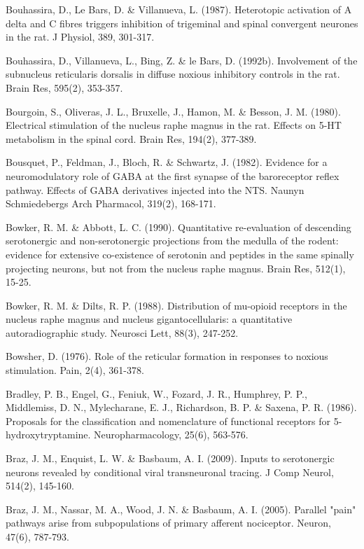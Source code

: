 \documentclass[a4paper,12pt,twoside]{report}
\begin{document}
\begin{singlespacing}
\begin{footnotesize}
Bouhassira, D., Le Bars, D. \& Villanueva, L. (1987). Heterotopic activation of A delta and C fibres triggers inhibition of trigeminal and spinal convergent neurones in the rat. J Physiol, 389, 301-317.

Bouhassira, D., Villanueva, L., Bing, Z. \& le Bars, D. (1992b). Involvement of the subnucleus reticularis dorsalis in diffuse noxious inhibitory controls in the rat. Brain Res, 595(2), 353-357.

Bourgoin, S., Oliveras, J. L., Bruxelle, J., Hamon, M. \& Besson, J. M. (1980). Electrical stimulation of the nucleus raphe magnus in the rat. Effects on 5-HT metabolism in the spinal cord. Brain Res, 194(2), 377-389.

Bousquet, P., Feldman, J., Bloch, R. \& Schwartz, J. (1982). Evidence for a neuromodulatory role of GABA at the first synapse of the baroreceptor reflex pathway. Effects of GABA derivatives injected into the NTS. Naunyn Schmiedebergs Arch Pharmacol, 319(2), 168-171.

Bowker, R. M. \& Abbott, L. C. (1990). Quantitative re-evaluation of descending serotonergic and non-\linebreak serotonergic projections from the medulla of the rodent: evidence for extensive co-existence of serotonin and peptides in the same spinally projecting neurons, but not from the nucleus raphe magnus. Brain Res, 512(1), 15-25.

Bowker, R. M. \& Dilts, R. P. (1988). Distribution of mu-opioid receptors in the nucleus raphe magnus and nucleus gigantocellularis: a quantitative autoradiographic study. Neurosci Lett, 88(3), 247-252.

Bowsher, D. (1976). Role of the reticular formation in responses to noxious stimulation. Pain, 2(4), 361-378.

Bradley, P. B., Engel, G., Feniuk, W., Fozard, J. R., Humphrey, P. P., Middlemiss, D. N., Mylecharane, E. J., Richardson, B. P. \& Saxena, P. R. (1986). Proposals for the classification and nomenclature of functional receptors for 5-hydroxytryptamine. Neuropharmacology, 25(6), 563-576.

Braz, J. M., Enquist, L. W. \& Basbaum, A. I. (2009). Inputs to serotonergic neurons revealed by conditional viral transneuronal tracing. J Comp Neurol, 514(2), 145-160.

Braz, J. M., Nassar, M. A., Wood, J. N. \& Basbaum, A. I. (2005). Parallel "pain" pathways arise from subpopulations of primary afferent nociceptor. Neuron, 47(6), 787-793.


\end{footnotesize}
\end{singlespacing}
\end{document}
